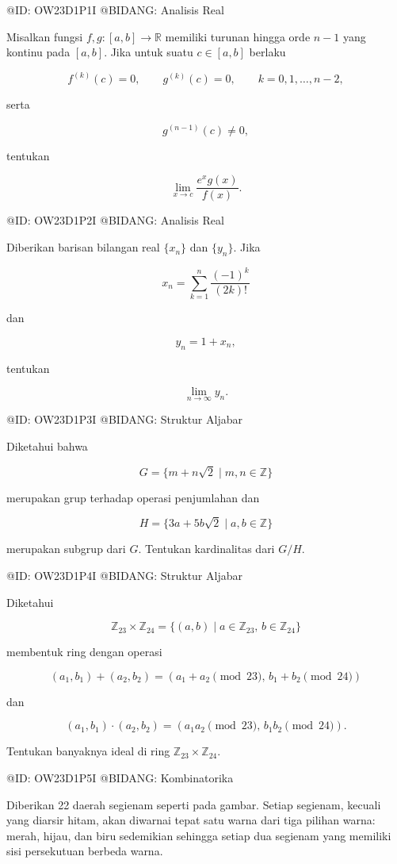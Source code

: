 @ID: OW23D1P1I
@BIDANG: Analisis Real

Misalkan fungsi $f,g:[a,b]\to\mathbb R$ memiliki turunan hingga orde $n-1$ yang kontinu pada $[a,b]$. Jika untuk suatu $c\in[a,b]$ berlaku

$$
f^{(k)}(c)=0,\qquad
g^{(k)}(c)=0,\qquad k=0,1,\ldots,n-2,
$$

serta

$$
g^{(n-1)}(c)\ne0,
$$

tentukan

$$
\lim_{x\to c}\frac{e^xg(x)}{f(x)}.
$$

@ID: OW23D1P2I
@BIDANG: Analisis Real

Diberikan barisan bilangan real $\{x_n\}$ dan $\{y_n\}$. Jika

$$
x_n=\sum_{k=1}^{n}\frac{(-1)^k}{(2k)!}
$$

dan

$$
y_n=1+x_n,
$$

tentukan

$$
\lim_{n\to\infty}y_n.
$$

@ID: OW23D1P3I
@BIDANG: Struktur Aljabar

Diketahui bahwa

$$
G=\{m+n\sqrt2\mid m,n\in\mathbb Z\}
$$

merupakan grup terhadap operasi penjumlahan dan

$$
H=\{3a+5b\sqrt2\mid a,b\in\mathbb Z\}
$$

merupakan subgrup dari $G$. Tentukan kardinalitas dari $G/H$.

@ID: OW23D1P4I
@BIDANG: Struktur Aljabar

Diketahui

$$
\mathbb Z_{23}\times\mathbb Z_{24}
=\{(a,b)\mid a\in\mathbb Z_{23},\,b\in\mathbb Z_{24}\}
$$

membentuk ring dengan operasi

$$
(a_1,b_1)+(a_2,b_2)
=
(a_1+a_2\!\!\!\pmod{23},\,b_1+b_2\!\!\!\pmod{24})
$$

dan

$$
(a_1,b_1)\cdot(a_2,b_2)
=
(a_1a_2\!\!\!\pmod{23},\,b_1b_2\!\!\!\pmod{24}).
$$

Tentukan banyaknya ideal di ring $\mathbb Z_{23}\times\mathbb Z_{24}$.

@ID: OW23D1P5I
@BIDANG: Kombinatorika

Diberikan 22 daerah segienam seperti pada gambar. Setiap segienam, kecuali yang diarsir hitam, akan diwarnai tepat satu warna dari tiga pilihan warna: merah, hijau, dan biru sedemikian sehingga setiap dua segienam yang memiliki sisi persekutuan berbeda warna.


